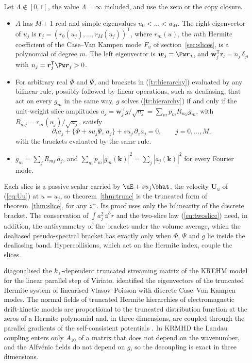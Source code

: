 \begin{theorem}\label{thm:trunc}
Let $\Lambda\notin[0,1]$, the value $\Lambda=\infty$ included, and use the zero or the copy closure.
\begin{itemize}
\item[(i)] $A$ has $M+1$ real and simple eigenvalues $u_0<\dots<u_M$. The right eigenvector of $u_j$ is $\boldsymbol r_j=(r_0(u_j),\dots,r_M(u_j))^{\mathsf T}$, where $r_m(u)$, the $m$th Hermite coefficient of the Case--Van Kampen mode $F_u$ of section~\ref{sec:slices}, is a polynomial of degree $m$. The left eigenvector is $\boldsymbol w_j=\Pw\boldsymbol r_j$, and $\boldsymbol w_j^{\mathsf T}\boldsymbol r_l=n_j\,\delta_{jl}$ with $n_j=\boldsymbol r_j^{\mathsf T}\Pw\boldsymbol r_j>0$.
\item[(ii)] For arbitrary real $\Phi$ and $\Psi$, and brackets in (\ref{tr:hierarchy}) evaluated by any bilinear rule, possibly followed by linear operations, such as dealiasing, that act on every $g_m$ in the same way, $g$ solves (\ref{tr:hierarchy}) if and only if the unit-weight slice amplitudes $a_j=\boldsymbol w_j^{\mathsf T}g/\sqrt{n_j}=\sum_mp_mR_{mj}g_m$, with $R_{mj}=r_m(u_j)/\sqrt{n_j}$, satisfy
\begin{equation}\label{eq:truncslice}
  \partial_ta_j+\{\Phi+su_j\Psi,\,a_j\}+su_j\,\partial_za_j=0,\qquad j=0,\dots,M,
\end{equation}
with the brackets evaluated by the same rule.
\item[(iii)] $g_m=\sum_jR_{mj}\,a_j$, and $\sum_mp_m|g_m(\boldsymbol k)|^2=\sum_j|a_j(\boldsymbol k)|^2$ for every Fourier mode.
\end{itemize}
\end{theorem}

Each slice is a passive scalar carried by $\uE+su_j\bhat$, the velocity $\boldsymbol U_u$ of (\ref{eq:Uu}) at $u=u_j$, so theorem~\ref{thm:trunc} is the truncated form of theorem~\ref{thm:slice}, for any $z^\pm$. Its proof uses only the bilinearity of the discrete bracket. The conservation of $\int a_j^2\,\dd^3r$ and the two-slice law (\ref{eq:twoslice}) need, in addition, the antisymmetry of the bracket under the volume average, which the dealiased pseudo-spectral bracket has exactly only when $\Phi$, $\Psi$ and $g$ lie inside the dealiasing band. Hypercollisions, which act on the Hermite index, couple the slices.

\citet[\S6.2.1]{Loureiro2016} diagonalised the $k_\perp$-dependent truncated streaming matrix of the KREHM model for the linear parallel step of Viriato. \citet{ParkerDellar2015} identified the eigenvectors of the truncated Hermite system of linearised Vlasov--Poisson with discrete Case--Van Kampen modes. The normal fields of truncated Hermite hierarchies of electromagnetic drift-kinetic models \citep{Tassi2015} are proportional to the truncated distribution function at the zeros of a Hermite polynomial and, in three dimensions, are coupled through the parallel gradients of the self-consistent potentials \citep[\S7]{Tassi2022}. In KRMHD the Landau coupling enters only $A_{10}$ of a matrix that does not depend on the wavenumber, and the Alfv\'enic fields do not depend on $g$, so the decoupling is exact in three dimensions.

